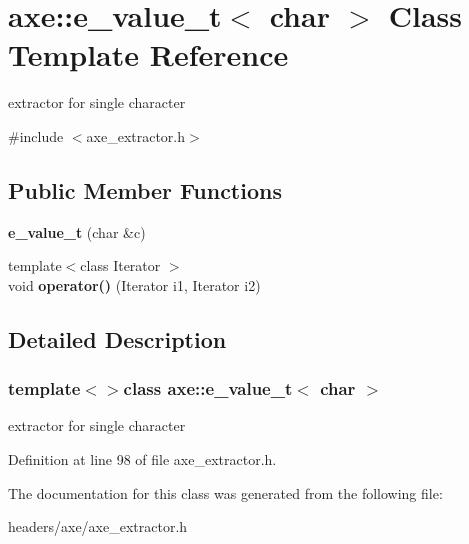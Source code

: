 \hypertarget{classaxe_1_1e__value__t_3_01char_01_4}{\section{axe\+:\+:e\+\_\+value\+\_\+t$<$ char $>$ Class Template Reference}
\label{classaxe_1_1e__value__t_3_01char_01_4}
}


extractor for single character  




{\ttfamily \#include $<$axe\+\_\+extractor.\+h$>$}

\subsection*{Public Member Functions}
\begin{DoxyCompactItemize}
\item 
\hypertarget{classaxe_1_1e__value__t_3_01char_01_4_ad1ef472466c830f610b54c4925c70a4d}{{\bfseries e\+\_\+value\+\_\+t} (char \&c)}\label{classaxe_1_1e__value__t_3_01char_01_4_ad1ef472466c830f610b54c4925c70a4d}

\item 
\hypertarget{classaxe_1_1e__value__t_3_01char_01_4_ae6a9837a76ffb4e83bc0782177d00367}{{\footnotesize template$<$class Iterator $>$ }\\void {\bfseries operator()} (Iterator i1, Iterator i2)}\label{classaxe_1_1e__value__t_3_01char_01_4_ae6a9837a76ffb4e83bc0782177d00367}

\end{DoxyCompactItemize}


\subsection{Detailed Description}
\subsubsection*{template$<$$>$class axe\+::e\+\_\+value\+\_\+t$<$ char $>$}

extractor for single character 

Definition at line 98 of file axe\+\_\+extractor.\+h.



The documentation for this class was generated from the following file\+:\begin{DoxyCompactItemize}
\item 
headers/axe/axe\+\_\+extractor.\+h\end{DoxyCompactItemize}
